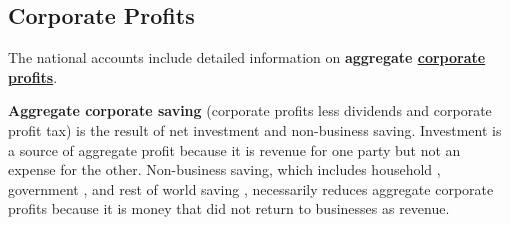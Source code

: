 \subsection*{Corporate Profits}
\hypertarget{buspr}{\label{buspr}}
\begin{minipage}{0.76\textwidth}   
\small The national accounts include detailed information on \textbf{aggregate \href{https://www.bea.gov/data/income-saving/corporate-profits}{corporate profits}}.  
\vspace{1mm}

\vspace{3.5cm}

\hspace{5mm} 

\vspace{4mm}

\small \textbf{Aggregate corporate saving} (corporate profits less dividends and corporate profit tax) is the result of net investment and non-business saving. Investment  is a source of aggregate profit because it is revenue for one party but not an expense for the other. Non-business saving, which includes household , government , and rest of world saving , necessarily reduces aggregate corporate profits because it is money that did not return to businesses as revenue. 
\vspace{1mm}


\end{minipage}
